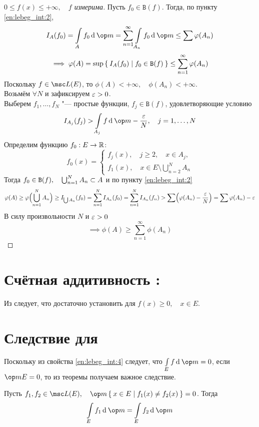 \begin{proof}[$ 0 \le f(x) \le +\infty, \quad f $ измерима]
	Пусть $ f_0 \in \mathtt B(f) $. Тогда, по пункту \ref{en:lebeg_int:2},
	$$ I_A(f_0) = \int\limits_A f_0 \di \op m = \sum_{n = 1}^\infty \int\limits_{A_n} f_0 \di \op m \le \sum \phi(A_n) $$
	$$ \implies \varphi(A) = \sup \Set{I_A(f_0) \mid f_0 \in \mathtt B(f)} \le \sum_{n = 1}^\infty \varphi(A_n) $$
	Поскольку $ f \in \msc L(E) $, то $ \phi(A) < +\infty, \quad \phi(A_n) < +\infty $. \\
	Возьмём $ \forall N $ и зафиксируем $ \varepsilon > 0 $. \\
	Выберем $ f_1, \dots, f_N $ "--- простые функции, $ f_j \in \mathtt B(f) $, удовлетворяющие условию
	$$ I_{A_j}(f_j) > \int\limits_{A_j} f \di \op m - \frac\eps N, \quad j = 1, \dots, N $$
	Определим функцию $ f_0 : E \to \mathbb{R} $:
	$$ f_0(x) =
	\begin{cases}
		f_j(x), \quad j \ge 2, \quad x \in A_j, \\
		f_1(x), \quad x \in E \setminus \bigcup_{n = 2}^N A_n
	\end{cases} $$
	Тогда $ f_0 \in \mathtt B(f), \quad \bigcup_{n = 1}^N A_n \subset A $ и по пункту \ref{en:lebeg_int:2}
	$$ \varphi(A) \ge \varphi \Bigl( \bigcup_{n = 1}^N A_n \Bigr) \ge I_{\bigcup A_n} (f_0) = \sum_{n = 1}^N I_{A_n} (f_0) = \sum_{n = 1}^N I_{A_n}(f_n) > \sum \Bigl( \varphi(A_n) - \frac{\varepsilon} N \Bigr) = \sum \varphi(A_n) - \varepsilon $$
	В силу произвольности $ N $ и $ \varepsilon > 0 $
	$$ \implies \phi(A) \ge \sum_{n = 1}^\infty \phi(A_n) $$
\end{proof}

\section{Счётная аддитивность : }

Из  следует, что достаточно установить  для $ f(x) \ge 0, \quad x \in E $.

\section{Следствие для }

Поскольку из свойства \ref{en:lebeg_int:4} следует, что $ \int\limits_E f \di \op m = 0 $, если $ \op m E = 0 $, то из теоремы получаем важное следствие.

\begin{implication}
	Пусть $ f_1, f_2 \in \msc L(E), \quad \op m \set{x \in E \mid f_1(x) \ne f_2(x)} = 0 $. Тогда
	$$ \int\limits_E f_1 \di \op m = \int\limits_E f_2 \di \op m $$
\end{implication}


